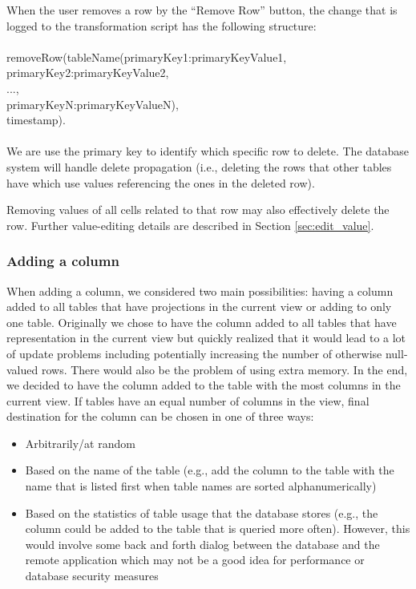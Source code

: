 \documentclass[12pt]{article}
\begin{document}
When the user removes a row by the ``Remove Row'' button, the change that is logged to the transformation script has the following structure: \\ \\
removeRow(tableName(primaryKey1:primaryKeyValue1, \\ 
\indent primaryKey2:primaryKeyValue2,\\
\indent ..., \\
\indent primaryKeyN:primaryKeyValueN), \\
\indent timestamp). \\ \\
We are use the primary key to identify which specific row to delete. The database system will handle delete propagation (i.e., deleting the rows that other tables have which use values referencing the ones in the deleted row).  

Removing values of all cells related to that row may also effectively delete the row.  Further value-editing details are described in Section \ref{sec:edit_value}.

\subsubsection{Adding a column}
\label{sec:add_col}
When adding a column, we considered two main possibilities: having a column added to all tables that have projections in the current view or adding to only one table.  Originally we chose to have the column added to all tables that have representation in the current view but quickly realized that it would lead to a lot of update problems including potentially increasing the number of otherwise null-valued rows. There would also be the problem of using extra memory. In the end, we decided to have the column added to the table with the most columns in the current view. If tables have an equal number of columns in the view, final destination for the column can be chosen in one of three ways:
\begin{itemize}
\item {Arbitrarily/at random}
\item {Based on the name of the table (e.g., add the column to the table with the name that is listed first when table names are sorted alphanumerically)}
\item {Based on the statistics of table usage that the database stores (e.g., the column could be added to the table that is queried more often). However, this would involve some back and forth dialog between the database and the remote application which may not be a good idea for performance or database security measures}
\end{itemize}
\end{document}

